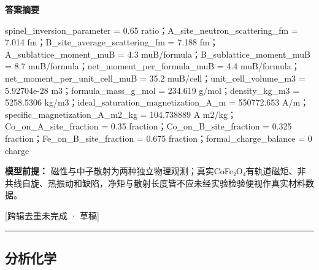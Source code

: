 \documentclass[UTF8,11pt,a4paper]{ctexart}
\begin{document}
\noindent\textbf{答案摘要}\par
spinel\_inversion\_parameter = 0.65 ratio；A\_site\_neutron\_scattering\_fm = 7.014 fm；B\_site\_average\_scattering\_fm = 7.188 fm；A\_sublattice\_moment\_muB = 4.3 muB/formula；B\_sublattice\_moment\_muB = 8.7 muB/formula；net\_moment\_per\_formula\_muB = 4.4 muB/formula；net\_moment\_per\_unit\_cell\_muB = 35.2 muB/cell；unit\_cell\_volume\_m3 = 5.92704e-28 m3；formula\_mass\_g\_mol = 234.619 g/mol；density\_kg\_m3 = 5258.5306 kg/m3；ideal\_saturation\_magnetization\_A\_m = 550772.653 A/m；specific\_magnetization\_A\_m2\_kg = 104.738889 A m2/kg；Co\_on\_A\_site\_fraction = 0.35 fraction；Co\_on\_B\_site\_fraction = 0.325 fraction；Fe\_on\_B\_site\_fraction = 0.675 fraction；formal\_charge\_balance = 0 charge\par
\noindent\textbf{模型前提：}
磁性与中子散射为两种独立物理观测；真实CoFe₂O₄有轨道磁矩、非共线自旋、热振动和缺陷，净矩与散射长度皆不应未经实验检验便视作真实材料数据。\par
\noindent\textcolor{red!65!black}{[跨辑去重未完成 · 草稿]} \par
\medskip\hrule\medskip
\subsection*{分析化学}
\end{document}
